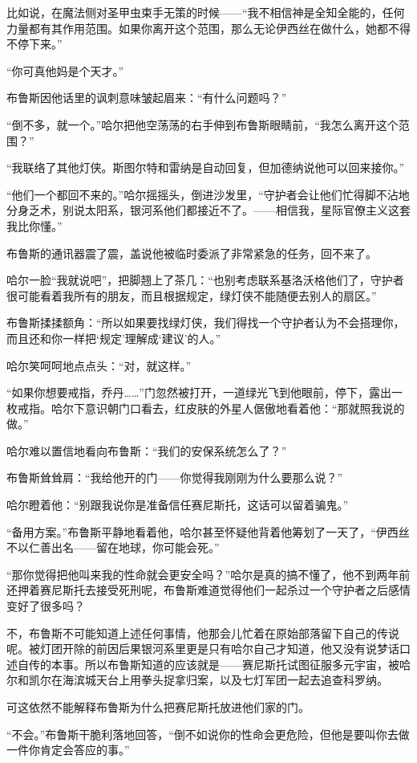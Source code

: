 \documentclass[../main]{subfiles}
\begin{document}
比如说，在魔法侧对圣甲虫束手无策的时候——“我不相信神是全知全能的，任何力量都有其作用范围。如果你离开这个范围，那么无论伊西丝在做什么，她都不得不停下来。”

“你可真他妈是个天才。”

布鲁斯因他话里的讽刺意味皱起眉来：“有什么问题吗？”

“倒不多，就一个。”哈尔把他空荡荡的右手伸到布鲁斯眼睛前，“我怎么离开这个范围？”

“我联络了其他灯侠。斯图尔特和雷纳是自动回复，但加德纳说他可以回来接你。”

“他们一个都回不来的。”哈尔摇摇头，倒进沙发里，“守护者会让他们忙得脚不沾地分身乏术，别说太阳系，银河系他们都接近不了。——相信我，星际官僚主义这套我比你懂。”

布鲁斯的通讯器震了震，盖说他被临时委派了非常紧急的任务，回不来了。

哈尔一脸“我就说吧”，把脚翘上了茶几：“也别考虑联系基洛沃格他们了，守护者很可能看着我所有的朋友，而且根据规定，绿灯侠不能随便去别人的扇区。”

布鲁斯揉揉额角：“所以如果要找绿灯侠，我们得找一个守护者认为不会搭理你，而且还和你一样把‘规定’理解成‘建议’的人。”

哈尔笑呵呵地点点头：“对，就这样。”

“如果你想要戒指，乔丹……”门忽然被打开，一道绿光飞到他眼前，停下，露出一枚戒指。哈尔下意识朝门口看去，红皮肤的外星人倨傲地看着他：“那就照我说的做。”

哈尔难以置信地看向布鲁斯：“我们的安保系统怎么了？”

布鲁斯耸耸肩：“我给他开的门——你觉得我刚刚为什么要那么说？”

哈尔瞪着他：“别跟我说你是准备信任赛尼斯托，这话可以留着骗鬼。”

“备用方案。”布鲁斯平静地看着他，哈尔甚至怀疑他背着他筹划了一天了，“伊西丝不以仁善出名——留在地球，你可能会死。”

“那你觉得把他叫来我的性命就会更安全吗？”哈尔是真的搞不懂了，他不到两年前还押着赛尼斯托去接受死刑呢，布鲁斯难道觉得他们一起杀过一个守护者之后感情变好了很多吗？

不，布鲁斯不可能知道上述任何事情，他那会儿忙着在原始部落留下自己的传说呢。被灯团开除的前因后果银河系里更是只有哈尔自己才知道，他又没有说梦话口述自传的本事。所以布鲁斯知道的应该就是——赛尼斯托试图征服多元宇宙，被哈尔和凯尔在海滨城天台上用拳头捉拿归案，以及七灯军团一起去追查科罗纳。

可这依然不能解释布鲁斯为什么把赛尼斯托放进他们家的门。

“不会。”布鲁斯干脆利落地回答，“倒不如说你的性命会更危险，但他是要叫你去做一件你肯定会答应的事。”
\end{document}
